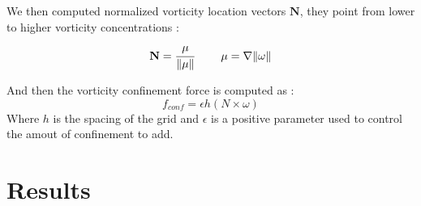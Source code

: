 \documentclass[accepted,single]{gipaper}
\begin{document}
We then computed normalized vorticity location vectors $\mathbf{N}$, they point from lower to higher vorticity concentrations : 
$$ \mathbf{N} = \cfrac{\mathbf{\mu}}{\Vert \mathbf{\mu} \Vert} ~~~~~~~ \mathbf{\mu}=\nabla \Vert \omega \Vert $$

And then the vorticity confinement force is computed as :
$$f_{conf} = \epsilon h (N \times \omega)$$
Where $h$ is the spacing of the grid and $\epsilon$ is a positive parameter used to control the amout of confinement to add.














\section{Results}
\end{document}
